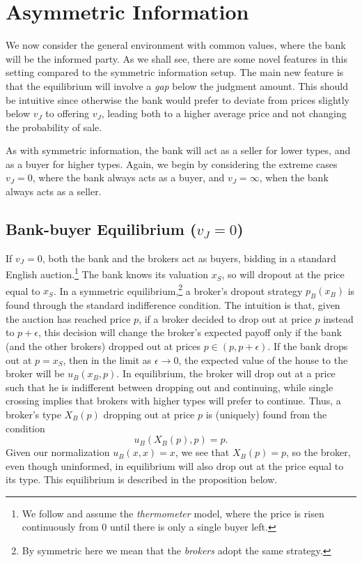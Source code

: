 \documentclass[11pt,twopage]{article}
\begin{document}
 
\section{Asymmetric Information}
\label{sec:asymmetric-information}

We now consider the general environment with common values, where the
bank will be the informed party. As we shall see, there are some novel
features in this setting compared to the symmetric information
setup. The main new feature is that the equilibrium will involve a
\emph{gap} below the judgment amount. This should be intuitive since
otherwise the bank would prefer to deviate from prices slightly below
$v_J$ to offering $v_J$, leading both to a higher average price and
not changing the probability of sale.

As with symmetric information, the bank will act as a seller for lower
types, and as a buyer for higher types. Again, we begin by considering
the extreme cases $v_J = 0$, where the bank always acts as a buyer,
and $v_J = \infty$, when the bank always acts as a seller.

\subsection{Bank-buyer Equilibrium ($v_J = 0$)}
\label{sec:vj0}

If $v_J=0$, both the bank and the brokers act as buyers, bidding in a
standard English auction.\footnote{We follow \cite{milgrom1982theory}
  and assume the \emph{thermometer} model, where the price is risen
  continuously from $0$ until there is only a single buyer left.} The
bank knows its valuation $x_S$, so will dropout at the price equal to
$x_S$. In a symmetric equilibrium,\footnote{By symmetric here we mean
  that the \emph{brokers} adopt the same strategy.} a broker's dropout
strategy $p_B(x_B)$ is found through the standard indifference
condition. The intuition is that, given the auction has reached price
$p$, if a broker decided to drop out at price $p$ instead to
$p+\epsilon$, this decision will change the broker's expected payoff
only if the bank (and the other brokers) dropped out at prices $p \in
(p,p+\epsilon)$. If the bank drops out at $p = x_S$, then in the limit
as $\epsilon \to 0$, the expected value of the house to the broker
will be $u_B(x_B, p)$. In equilibrium, the broker will drop out at a
price such that he is indifferent between dropping out and continuing,
while single crossing implies that brokers with higher types will
prefer to continue. Thus, a broker's type $X_B(p)$ dropping out at
price $p$ is (uniquely) found from the condition \[ u_B(X_B(p),p) =
p.\] Given our normalization $u_B(x,x) = x$, we see that $X_B(p) = p$,
so the broker, even though uninformed, in equilibrium will also drop
out at the price equal to its type. This equilibrium is described in
the proposition below.
\end{document}
